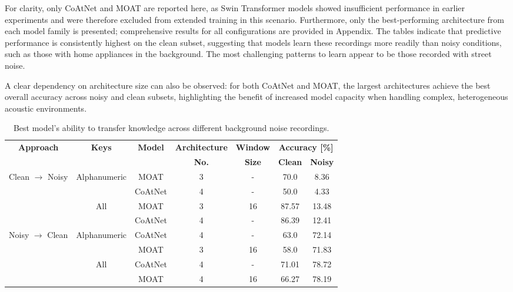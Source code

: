 \documentclass[a4paper,11pt,twoside]{report}
\theoremstyle{definition}
\begin{document}
For clarity, only CoAtNet and MOAT are reported here, as Swin Transformer models showed insufficient performance in earlier experiments and were therefore excluded from extended training in this scenario. Furthermore, only the best-performing architecture from each model family is presented; comprehensive results for all configurations are provided in Appendix. The tables indicate that predictive performance is consistently highest on the clean subset, suggesting that models learn these recordings more readily than noisy conditions, such as those with home appliances in the background. The most challenging patterns to learn appear to be those recorded with street noise.

A clear dependency on architecture size can also be observed: for both CoAtNet and MOAT, the largest architectures achieve the best overall accuracy across noisy and clean subsets, highlighting the benefit of increased model capacity when handling complex, heterogeneous acoustic environments.

\begin{table}[h!]
\centering
\caption{Best model's ability to transfer knowledge across different background noise recordings.}
\begin{adjustbox}{max width=\textwidth}
\begin{tabular}{c|c|c|c|c|cc}
\hline
\textbf{Approach} & \textbf{Keys} & \textbf{Model} & \textbf{Architecture} & \textbf{Window} &  \multicolumn{2}{c}{\textbf{Accuracy [\%]}} \\
\cline{6-7}
       & & & \textbf{No.}  &   \textbf{Size}   &  \textbf{Clean} & \textbf{Noisy}  \\
\hline
\multirow{4}{*}{Clean $\rightarrow$ Noisy}
& \multirow{2}{*}{Alphanumeric} & MOAT    & 3 & -  & 70.0  & 8.36  \\
&                               & CoAtNet & 4 & -  & 50.0  & 4.33  \\
\cline{2-7}
& \multirow{2}{*}{All}          & MOAT    & 3 & 16 & 87.57 & 13.48 \\
&                               & CoAtNet & 4 & -  & 86.39 & 12.41 \\
\hline
\multirow{4}{*}{Noisy $\rightarrow$ Clean}
& \multirow{2}{*}{Alphanumeric} & CoAtNet & 4 & -  & 63.0  & 72.14 \\
&                               & MOAT    & 3 & 16 & 58.0  & 71.83 \\
\cline{2-7}
& \multirow{2}{*}{All}          & CoAtNet & 4 & -  & 71.01 & 78.72 \\
&                               & MOAT    & 4 & 16 & 66.27 & 78.19 \\
\hline
\end{tabular}
\end{adjustbox}
\label{tab:transfer_accuracy}
\end{table}
\end{document}
